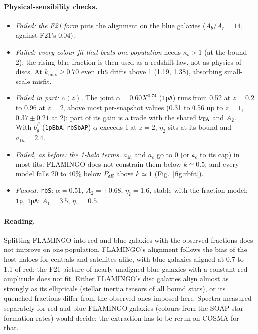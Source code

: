 \documentclass[11pt]{article}
\newcommand{\kmax}{k_{\max}}
\newcommand{\bTA}{b_{\rm TA}}
\begin{document}
\paragraph{Physical-sensibility checks.}
\begin{itemize}[itemsep=1pt]
\item \emph{Failed: the F21 form} puts the alignment on the blue galaxies
  ($A_b/A_r = 14$, against F21's 0.04).
\item \emph{Failed: every colour fit that beats one population} needs
  $\kappa_b > 1$ (at the bound 2): the rising blue fraction is then used as a
  redshift law, not as physics of discs. At $\kmax \ge 0.70$ even
  \texttt{rbS} drifts above 1 (1.19, 1.38), absorbing small-scale misfit.
\item \emph{Failed in part: $\alpha(z)$.} The joint $\alpha = 0.60X^{0.74}$
  (\texttt{1pA}) runs from 0.52 at $z = 0.2$ to 0.96 at $z = 2$, above most
  per-snapshot values (0.31 to 0.56 up to $z = 1$, $0.37 \pm 0.21$ at 2): part
  of its gain is a trade with the shared $\bTA$ and $A_2$. With $b_g^\beta$
  (\texttt{1pBbA}, \texttt{rbSbAP}) $\alpha$ exceeds 1 at $z = 2$, $\eta_2$
  sits at its bound and $a_{1h} = 2.4$.
\item \emph{Failed, as before: the 1-halo terms.} $a_{1h}$ and $a_c$ go to 0
  (or $a_c$ to its cap) in most fits; FLAMINGO does not constrain them below
  $k \simeq 0.5$, and every model falls 20 to 40\% below $P_{\delta E}$ above
  $k \simeq 1$ (Fig.~\ref{fig:rbfit}).
\item \emph{Passed.} \texttt{rbS}: $\alpha = 0.51$, $A_2 = +0.68$,
  $\eta_2 = 1.6$, stable with the fraction model; \texttt{1p}, \texttt{1pA}:
  $A_1 = 3.5$, $\eta_1 = 0.5$.
\end{itemize}

\paragraph{Reading.} Splitting FLAMINGO into red and blue galaxies with the
observed fractions does not improve on one population. FLAMINGO's alignment
follows the bias of the host haloes for centrals and satellites alike, with
blue galaxies aligned at 0.7 to 1.1 of red; the F21 picture of nearly
unaligned blue galaxies with a constant red amplitude does not fit. Either
FLAMINGO's disc galaxies align almost as strongly as its ellipticals (stellar
inertia tensors of all bound stars), or its quenched fractions differ from
the observed ones imposed here. Spectra measured separately for red and blue
FLAMINGO galaxies (colours from the SOAP star-formation rates) would decide;
the extraction has to be rerun on COSMA for that.
\end{document}
